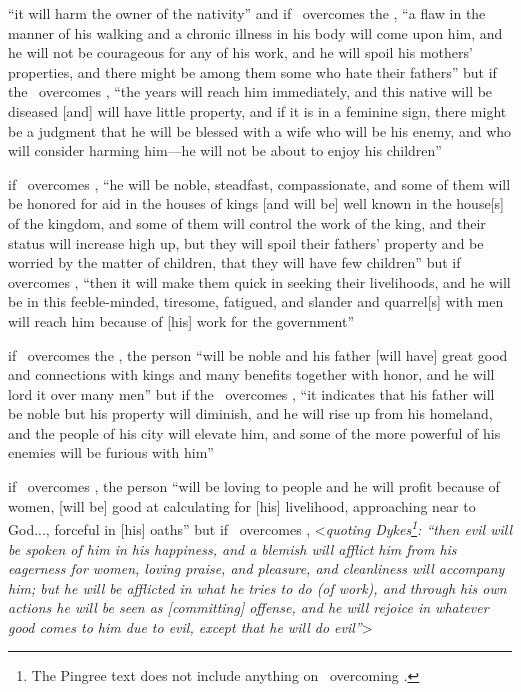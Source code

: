 \begin{description}[style=multiline,leftmargin=1.5cm]
\item[\Saturn\Square\Moon] ``it will harm the owner of the nativity'' and if \Saturn\, overcomes the \Moon, ``a flaw in the manner of his walking and a chronic illness in his body will come upon him, and he will not be courageous for any of his work, and he will spoil his mothers' properties, and there might be among them some who hate their fathers'' but if the \Moon\, overcomes \Saturn, ``the years will reach him immediately, and this native will be diseased [and] will have little property, and if it is in a feminine sign, there might be a judgment that he will be blessed with a wife who will be his enemy, and who will consider harming him---he will not be about to enjoy his children''

\item[\Jupiter\Square\Mars] if \Jupiter\, overcomes \Mars, ``he will be noble, steadfast, compassionate, and some of them will be honored for aid in the houses of kings [and will be] well known in the house[s] of the kingdom, and some of them will control the work of the king, and their status will increase high up, but they will spoil their fathers' property and be worried by the matter of children, that they will have few children'' but if \Mars\, overcomes \Jupiter, ``then it will make them quick in seeking their livelihoods, and he will be in this feeble-minded, tiresome, fatigued, and slander and quarrel[s] with men will reach him because of [his] work for the government''

\item[\Jupiter\Square\Sun] if \Jupiter\, overcomes the \Sun, the person ``will be noble and his father [will have] great good and connections with kings and many benefits together with honor, and he will lord it over many men'' but if the \Sun\, overcomes \Jupiter, ``it indicates that his father will be noble but his property will diminish, and he will rise up from his homeland, and the people of his city will elevate him, and some of the more powerful of his enemies will be furious with him''

\item[\Jupiter\Square\Venus] if \Jupiter\, overcomes \Venus, the person ``will be loving to people and he will profit because of women, [will be] good at calculating for [his] livelihood, approaching near to God..., forceful in [his] oaths'' but if \Venus\, overcomes \Jupiter, <\textsl{quoting Dykes\footnote{The Pingree text does not include anything on \Venus\, overcoming \Jupiter.}: ``then evil will be spoken of him in his happiness, and a blemish will afflict him from his eagerness for women, loving praise, and pleasure, and cleanliness will accompany him; but he will be afflicted in what he tries to do (of work), and through his own actions he will be seen as [committing] offense, and he will rejoice in whatever good comes to him due to evil, except that he will do evil''}>


\end{description}
